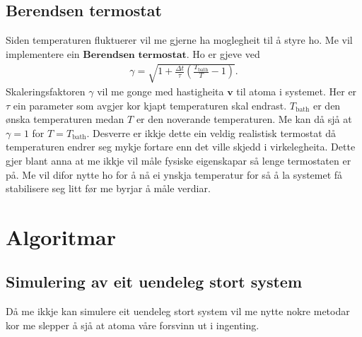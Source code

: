\documentclass[12pt, a4paper]{article}
\theoremstyle{definition} \newtheorem*{definition}{Teorem}
\newcommand{\vb}{\mathbf}
\begin{document}
    \subsection*{Berendsen termostat}
        Siden temperaturen fluktuerer vil me gjerne ha moglegheit til å styre ho. Me vil implementere ein $\textbf{Berendsen termostat}$. Ho er gjeve ved 
        \begin{align*}
            \gamma = \sqrt{1 + \frac{\Delta t}{\tau}\left( \frac{T_{\text{bath}}}{T} - 1 \right)}.
        \end{align*}
        Skaleringsfaktoren $\gamma$ vil me gonge med hastigheita $\vb{v}$ til atoma i systemet. Her er $\tau$ ein parameter som avgjer kor kjapt temperaturen skal endrast.
        $T_{\text{bath}}$ er den ønska temperaturen medan $T$ er den noverande temperaturen. Me kan då sjå at $\gamma = 1$ for $T = T_{\text{bath}}$. Desverre er ikkje dette
        ein veldig realistisk termostat då temperaturen endrer seg mykje fortare enn det ville skjedd i virkelegheita. Dette gjer blant anna at me ikkje vil måle fysiske eigenskapar
        så lenge termostaten er på. Me vil difor nytte ho for å nå ei ynskja temperatur for så å la systemet få stabilisere seg litt før me byrjar å måle verdiar.


\newpage


\section*{Algoritmar}

    \subsection*{Simulering av eit uendeleg stort system}
        Då me ikkje kan simulere eit uendeleg stort system vil me nytte nokre metodar kor me slepper å sjå at atoma våre forsvinn ut i ingenting.
\end{document}
